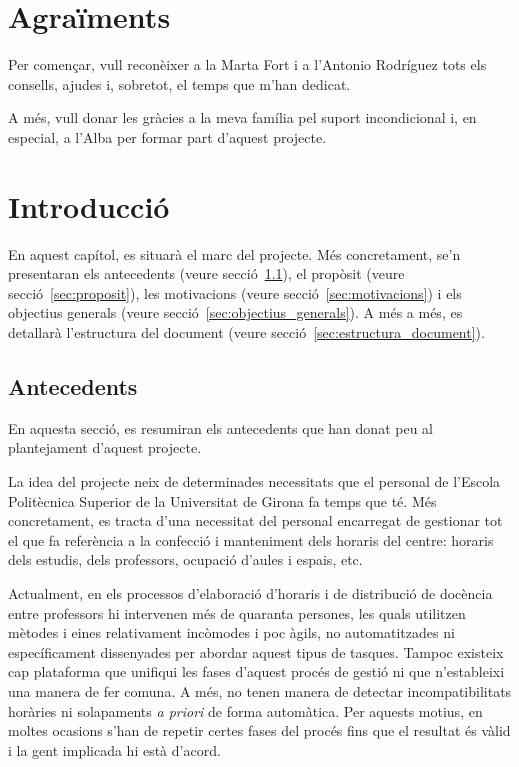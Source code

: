 \documentclass[a4paper,12pt]{ThesisStyle}
\begin{document}
\let\cleardoublepage\clearpage
{}
\frontmatter
\dominitoc

\chapter*{Agraïments}
\label{cap:agraiments}

Per començar, vull reconèixer a la Marta Fort i a l'Antonio Rodríguez tots els consells, ajudes i, sobretot, el temps que m'han dedicat.

A més, vull donar les gràcies a la meva família pel suport incondicional i, en especial, a l'Alba per formar part d'aquest projecte.


\tableofcontents
\listoffigures
\listoftables

\mainmatter

\chapter{Introducció}
\label{cap:intro}

En aquest capítol, es situarà el marc del projecte. Més concretament, se'n presentaran els antecedents (veure secció~\ref{sec:antecedents}), el propòsit (veure secció~\ref{sec:proposit}), les motivacions (veure secció~\ref{sec:motivacions}) i els objectius generals (veure secció~\ref{sec:objectius_generals}). A més a més, es detallarà l'estructura del document (veure secció~\ref{sec:estructura_document}).

\section{Antecedents}
\label{sec:antecedents}

En aquesta secció, es resumiran els antecedents que han donat peu al plantejament d'aquest projecte.

La idea del projecte neix de determinades necessitats que el personal de l'Escola Politècnica Superior de la Universitat de Girona fa temps que té. Més concretament, es tracta d'una necessitat del personal encarregat de gestionar tot el que fa referència a la confecció i manteniment dels horaris del centre: horaris dels estudis, dels professors, ocupació d'aules i espais, etc.

Actualment, en els processos d'elaboració d'horaris i de distribució de docència entre professors hi intervenen més de quaranta persones, les quals utilitzen mètodes i eines relativament incòmodes i poc àgils, no automatitzades ni específicament dissenyades per abordar aquest tipus de tasques. Tampoc existeix cap plataforma que unifiqui les fases d'aquest procés de gestió ni que n'estableixi una manera de fer comuna. A més, no tenen manera de detectar incompatibilitats horàries ni solapaments \textit{a priori} de forma automàtica. Per aquests motius, en moltes ocasions s'han de repetir certes fases del procés fins que el resultat és vàlid i la gent implicada hi està d'acord.
\end{document}
